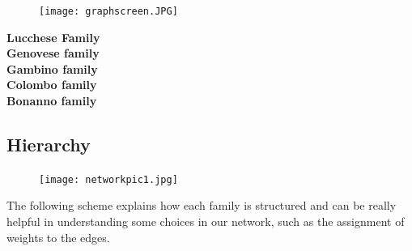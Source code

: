 \documentclass{article}
\begin{document}
\begin{figure}[hbt!]
\centering
\texttt{[image: graphscreen.JPG]}
\advance\leftskip-3cm
\end{figure}



\vspace{-50pt}
\begin{flushright}
\advance\rightskip-2cm
\color{Lucchese}
\textbf{Lucchese Family}\\
\color{Genovese}
\textbf{Genovese family}\\
\color{Gambino}
\textbf{Gambino family}\\
\color{Colombo}
\textbf{Colombo family}\\
\color{Bonanno}
\textbf{Bonanno family}
\end{flushright}
\newpage



\subsection*{\hypertarget{Hierarchy}{\textcolor{Titoli}{Hierarchy}}}



\begin{figure}[t!]
\vspace{-250pt}
\centering
\texttt{[image: networkpic1.jpg]}
\advance\leftskip-3.52cm
\end{figure}



The following scheme explains how each family is structured and can be really helpful in understanding some choices in our network, such as the assignment of weights to the edges.
\end{document}
